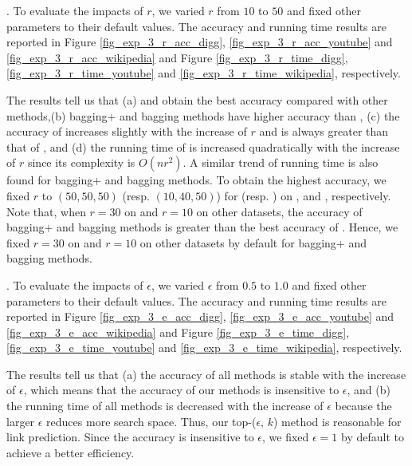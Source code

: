. To evaluate the impacts of $r$, we
varied $r$ from $10$ to $50$ and fixed other parameters to their
default values. The accuracy and running time results are reported in
Figure \ref{fig_exp_3_r_acc_digg}, \ref{fig_exp_3_r_acc_youtube} and
\ref{fig_exp_3_r_acc_wikipedia} and Figure \ref{fig_exp_3_r_time_digg},
\ref{fig_exp_3_r_time_youtube} and \ref{fig_exp_3_r_time_wikipedia}, respectively.


The results tell us that (a) \Biasedp and \Biased obtain the best accuracy
compared with other methods,(b) bagging+ and bagging methods have higher accuracy
than \BIGCLAM, (c) the accuracy of \NMF increases slightly with the increase of $r$ and is always
greater than that of \BIGCLAM, and (d) the running time of \NMF is increased
quadratically with the increase of $r$ since its complexity is $O(nr^2)$.
A similar trend of running time is also found for bagging+ and bagging methods.
To obtain the highest accuracy, we fixed $r$ to $(50, 50, 50)$ (resp. $(10, 40, 50)$)
for \NMF (resp. \BIGCLAM) on \Digg, \YouTube and \Wikipedia, respectively.
Note that, when $r = 30$ on \Digg and $r = 10$ on other datasets, the accuracy
of bagging+ and bagging methods is greater than the best accuracy of \NMF. Hence, we
fixed $r = 30$ on \Digg and $r = 10$ on other datasets by default for bagging+ and bagging methods.






. To evaluate the impacts of $\epsilon$, we
varied $\epsilon$ from $0.5$ to $1.0$ and fixed other parameters to their
default values. The accuracy and running time results are reported in
Figure \ref{fig_exp_3_e_acc_digg}, \ref{fig_exp_3_e_acc_youtube} and
\ref{fig_exp_3_e_acc_wikipedia} and Figure \ref{fig_exp_3_e_time_digg},
\ref{fig_exp_3_e_time_youtube} and \ref{fig_exp_3_e_time_wikipedia}, respectively.



The results tell us that (a) the accuracy of all methods is stable with
the increase of $\epsilon$, which means that the accuracy of our methods is insensitive
to $\epsilon$, and (b) the running time of all methods is decreased with the increase of $\epsilon$
because the larger $\epsilon$ reduces more search space. Thus, our top-($\epsilon$, $k$)
method is reasonable for link prediction. Since the accuracy is insensitive to $\epsilon$, we
fixed $\epsilon = 1$ by default to achieve a better efficiency.





